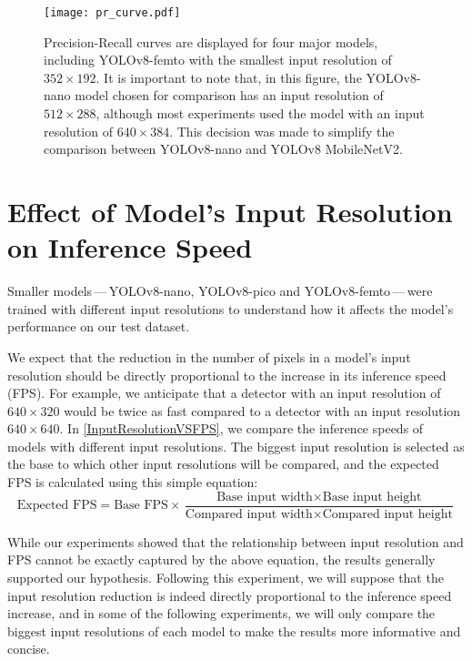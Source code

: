 \begin{figure}[H]
    \begin{framed}
        \centering
        \texttt{[image: pr\_curve.pdf]}
        \caption{Precision-Recall curves are displayed for four major models,
        including YOLOv8-femto with the smallest input resolution of $352 \times 192$. It
        is important to note that, in this figure, the YOLOv8-nano model chosen for
        comparison has an input resolution of $512 \times 288$, although most experiments
        used the model with an input resolution of $640 \times 384$. This decision was
        made to simplify the comparison between YOLOv8-nano and YOLOv8 MobileNetV2.}
        \label{PRCurveMajor}
    \end{framed}
\end{figure}






\section{Effect of Model's Input Resolution on Inference Speed}
\label{InputResolutionVSFPSExperiment}

Smaller models\,---\,YOLOv8-nano, YOLOv8-pico and YOLOv8-femto\,---\,were
trained with different input resolutions to understand how it affects the
model's performance on our test dataset.

We expect that the reduction in the number of pixels in a model's input
resolution should be directly proportional to the increase in its inference
speed (FPS). For example, we anticipate that a detector with an input resolution
of $640 \times 320$ would be twice as fast compared to a detector with an input
resolution $640 \times 640$. In \autoref{InputResolutionVSFPS}, we compare the
inference speeds of models with different input resolutions. The biggest input
resolution is selected as the base to which other input resolutions will be
compared, and the expected FPS is calculated using this simple equation:
\begin{equation}
    \text{Expected FPS} = \text{Base FPS} \times \frac{\text{Base input width} \times \text{Base input height}}{\text{Compared input width} \times \text{Compared input height}}
\end{equation}

While our experiments showed that the relationship between input resolution and FPS
cannot be exactly captured by the above equation, the results generally
supported our hypothesis. Following this experiment, we will suppose that the
input resolution reduction is indeed directly proportional to the inference speed
increase, and in some of the following experiments, we will only compare the
biggest input resolutions of each model to make the results more informative and
concise.

